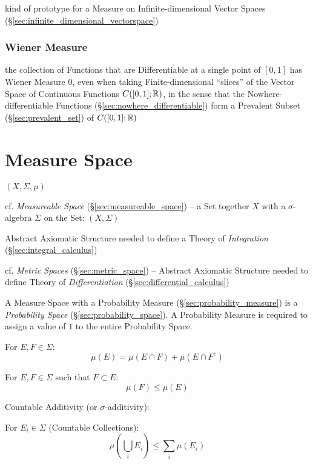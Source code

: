 kind of prototype for a Measure on Infinite-dimensional Vector Spaces
(\S\ref{sec:infinite_dimensional_vectorspace})



\subsubsection{Wiener Measure}\label{sec:wiener_measure}\hfill

the collection of Functions that are Differentiable at a single point of
$[0,1]$ has Wiener Measure $0$, even when taking Finite-dimensional ``slices''
of the Vector Space of Continuous Functions $C([0,1];\mathbb{R})$, in the sense
that the Nowhere-differentiable Functions (\S\ref{sec:nowhere_differentiable})
form a Prevalent Subset (\S\ref{sec:prevalent_set}) of $C([0,1]; \mathbb{R})$



\section{Measure Space}\label{sec:measure_space}

$(X,\Sigma,\mu)$

\fist cf. \emph{Measureable Space} (\S\ref{sec:measureable_space}) -- a Set
together $X$ with a $\sigma$-algebra $\Sigma$ on the Set: $(X,\Sigma)$

Abstract Axiomatic Structure needed to define a Theory of \emph{Integration}
(\S\ref{sec:integral_calculus})

cf. \emph{Metric Spaces} (\S\ref{sec:metric_space}) -- Abstract Axiomatic
Structure needed to define Theory of \emph{Differentiation}
(\S\ref{sec:differential_calculus})

A Measure Space with a Probability Measure (\S\ref{sec:probability_measure}) is
a \emph{Probability Space} (\S\ref{sec:probability_space}). A Probability
Measure is required to assign a value of $1$ to the entire Probability Space.

For $E,F \in \Sigma$:
\[
  \mu(E) = \mu(E \cap F) + \mu(E \cap F^c)
\]

For $E,F \in \Sigma$ such that $F \subset E$:
\[
  \mu(F) \leq \mu(E)
\]

Countable Additivity (or $\sigma$-additivity): %

For $E_i \in \Sigma$ (Countable Collections):
\[
  \mu(\bigcup_i E_i) \leq \sum_i \mu(E_i)
\]



